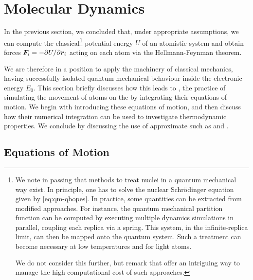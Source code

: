 
\chapter{Molecular Dynamics}
\label{ch:md}


\noindent
In the previous section, we concluded that, under appropriate assumptions, we can compute the classical\footnote{We note in passing that methods to treat nuclei in a quantum mechanical way exist. In principle, one has to solve the nuclear Schrödinger equation given by \cref{eq:qm-qbopes}. In practice, some quantities can be extracted from modified \md approaches. For instance, the quantum mechanical partition function can be computed by executing multiple dynamics simulations in parallel, coupling each replica via a spring. This  system, in the infinite-replica limit, can then be mapped onto the quantum system. Such a  \md treatment can become necessary at low temperatures and for light atoms.~\cite{tbmk1993p}

We do not consider this further, but remark that \mlps offer an intriguing way to manage the high computational cost of such approaches.} potential energy $U$ of an atomistic system and obtain forces $\boldsymbol{F}_i = -\partial U_{} / \partial \boldsymbol{r}_{i}$ acting on each atom via the Hellmann-Feynman theorem.


We are therefore in a position to apply the machinery of classical mechanics, having successfully isolated quantum mechanical behaviour inside the electronic energy $E_0$.
This section briefly discusses how this leads to , the practice of simulating the movement of atoms on the \bo \pes by integrating their equations of motion.
We begin with introducing these equations of motion, and then discuss how their numerical integration can be used to investigate thermodynamic properties. We conclude by discussing the use of approximate \pes such as \ffs and \mlps.

\section{Equations of Motion}

